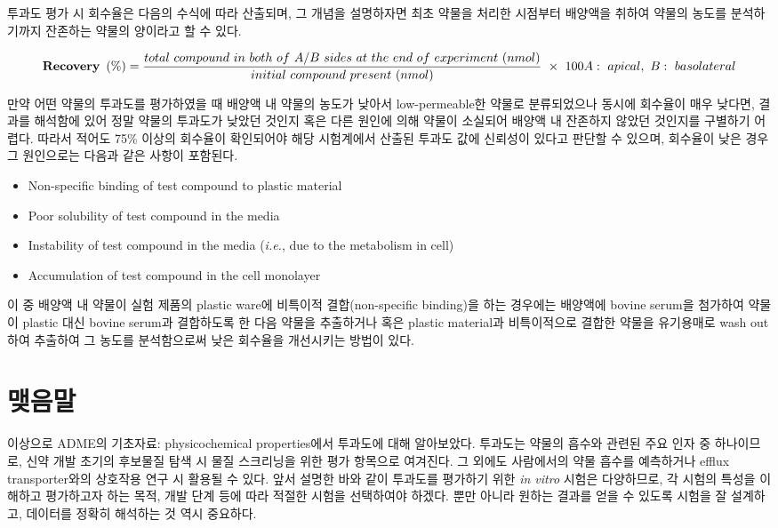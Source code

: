 \documentclass[
  11pt,
  krantz2, a4paper, twoside]{krantz}
\providecommand{\tightlist}{%
  \setlength{\itemsep}{0pt}\setlength{\parskip}{0pt}}
\begin{document}
투과도 평가 시 회수율은 다음의 수식에 따라 산출되며, 그 개념을 설명하자면 최초 약물을 처리한 시점부터 배양액을 취하여 약물의 농도를 분석하기까지 잔존하는 약물의 양이라고 할 수 있다.

\begin{equation}
\mathbf{Recovery\ }\left( \mathbf{\%} \right) = \frac{total\ compound\ in\ both\ of\ A/B\ sides\ at\ the\ end\ of\ experiment\ (nmol)}{initial\ compound\ present\ (nmol)}\  \times \ 100 \\
A:\ apical,\ B:\ basolateral
\label{eq:eq02-03}
\end{equation}

만약 어떤 약물의 투과도를 평가하였을 때 배양액 내 약물의 농도가 낮아서 low-permeable한 약물로 분류되었으나 동시에 회수율이 매우 낮다면, 결과를 해석함에 있어 정말 약물의 투과도가 낮았던 것인지 혹은 다른 원인에 의해 약물이 소실되어 배양액 내 잔존하지 않았던 것인지를 구별하기 어렵다.
따라서 적어도 75\% 이상의 회수율이 확인되어야 해당 시험계에서 산출된 투과도 값에 신뢰성이 있다고 판단할 수 있으며, 회수율이 낮은 경우 그 원인으로는 다음과 같은 사항이 포함된다.

\begin{itemize}
\tightlist
\item
  Non-specific binding of test compound to plastic material
\item
  Poor solubility of test compound in the media
\item
  Instability of test compound in the media (\emph{i.e.}, due to the metabolism in cell)
\item
  Accumulation of test compound in the cell monolayer
\end{itemize}

이 중 배양액 내 약물이 실험 제품의 plastic ware에 비특이적 결합(non-specific binding)을 하는 경우에는 배양액에 bovine serum을 첨가하여 약물이 plastic 대신 bovine serum과 결합하도록 한 다음 약물을 추출하거나 혹은 plastic material과 비특이적으로 결합한 약물을 유기용매로 wash out하여 추출하여 그 농도를 분석함으로써 낮은 회수율을 개선시키는 방법이 있다.

\hypertarget{uxb9fauxc74cuxb9d0-1}{%
\section{맺음말}\label{uxb9fauxc74cuxb9d0-1}}

이상으로 ADME의 기초자료: physicochemical properties에서 투과도에 대해 알아보았다.
투과도는 약물의 흡수와 관련된 주요 인자 중 하나이므로, 신약 개발 초기의 후보물질 탐색 시 물질 스크리닝을 위한 평가 항목으로 여겨진다.
그 외에도 사람에서의 약물 흡수를 예측하거나 efflux transporter와의 상호작용 연구 시 활용될 수 있다.
앞서 설명한 바와 같이 투과도를 평가하기 위한 \emph{in vitro} 시험은 다양하므로, 각 시험의 특성을 이해하고 평가하고자 하는 목적, 개발 단계 등에 따라 적절한 시험을 선택하여야 하겠다.
뿐만 아니라 원하는 결과를 얻을 수 있도록 시험을 잘 설계하고, 데이터를 정확히 해석하는 것 역시 중요하다.
\end{document}
